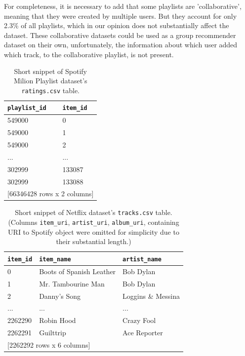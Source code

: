 For completeness, it is necessary to add that some playlists are 'collaborative', meaning that they were created by multiple users. But they account for only 2.3\% of all playlists, which in our opinion does not substantially affect the dataset. These collaborative datasets could be used as a group recommender dataset on their own, unfortunately, the information about which user added which track, to the collaborative playlist, is not present.

\begin{table}[!ht]
    \centering
    \begin{tabular}{ l l }
        \verb|playlist_id|   & \verb|item_id| \\
        \hline
        549000     &  0  \\
        549000     & 1  \\
        549000     & 2  \\
        ...      & ...  \\
        302999 & 133087 \\
        302999 & 133088 \\ [1mm]
        \multicolumn{2}{l}{{[66346428 rows x 2 columns]}}
    \end{tabular}
    \caption{Short snippet of Spotify Milion Playlist dataset's \texttt{ratings.csv} table.}
    \label{table:5.1_Spotify_ratings}
\end{table}


\begin{table}[!ht]
    \centering
    \begin{tabular}{ l l l }
        \verb|item_id| & \verb|item_name| & \verb|artist_name|  \\
        \hline
             0 & Boots of Spanish Leather &         Bob Dylan \\
             1 &       Mr. Tambourine Man &         Bob Dylan \\
             2 &             Danny's Song & Loggins \& Messina \\ 
           ... &                      ... &               ... \\
       2262290 &               Robin Hood &        Crazy Fool \\
       2262291 &                Guilttrip &      Ace Reporter \\ [1mm]
       \multicolumn{3}{l}{{[2262292 rows x 6 columns]}}
    \end{tabular}
    \caption[Short snippet of Netflix dataset's \texttt{tracks.csv} table.]{Short snippet of Netflix dataset's \texttt{tracks.csv} table. (Columns \texttt{item\_uri}, \texttt{artist\_uri}, \texttt{album\_uri}, containing URI to Spotify object were omitted for simplicity due to their substantial length.)}
    \label{table:5.1_Spotify_tracks}
\end{table}

